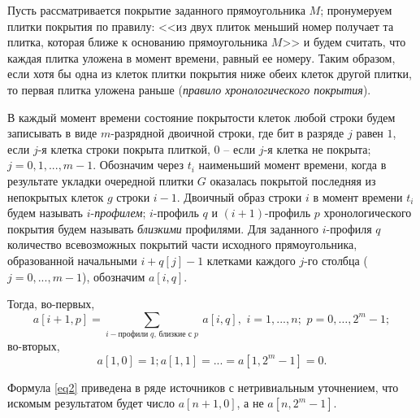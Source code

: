 Пусть рассматривается покрытие заданного прямоугольника $M$; пронумеруем плитки покрытия по правилу: <<из двух плиток меньший номер получает та плитка, которая ближе к основанию прямоугольника $M$>> и будем считать, что каждая плитка уложена в момент времени, равный ее номеру. Таким образом, если  хотя бы одна из клеток плитки покрытия ниже обеих клеток другой плитки, то первая плитка уложена раньше  (\textit{правило хронологического покрытия}).

В каждый момент времени состояние покрытости клеток любой строки будем записывать в виде $m$-разрядной двоичной строки, где бит в разряде $j$ равен $1$, если $j$-я клетка строки покрыта плиткой, $0$ – если $j$-я клетка не покрыта; $j=0,1,...,m-1.$  
Обозначим через $t_i$ наименьший момент времени, когда в результате укладки очередной плитки $G$ оказалась покрытой последняя из непокрытых клеток $g$ строки $i-1$.
Двоичный образ строки $i$ в момент времени $t_i$ будем называть $i$-\textit{профилем};
 $i$-профиль $q$ и $(i+1)$-профиль $p$ хронологического покрытия будем называть {\it близкими} профилями.
Для заданного $i$-профиля $q$ количество всевозможных покрытий части исходного прямоугольника, образованной начальными $i+q[j]-1$ клетками каждого $j$-го столбца ($j=0,..., m-1$), обозначим $a[i,q]$.

Тогда, во-первых, 
\begin{equation}\label{eq2}
a[i+1,p]=\sum_{i-\text{профили}\; q,\, \text{близкие с}\; p}\ a[i,q] ,\,\,                        
i=1,...,n;\,\, p=0,…,2^m-1;     
\end{equation}
во-вторых,
\[a[1,0]=1; a[1,1]=...=a[1,2^m-1]=0.\]

Формула \eqref{eq2} приведена в ряде источников
 с нетривиальным уточнением, что искомым результатом будет число $a[n+1,0]$, 
а не $a[n,2^m-1]$.

